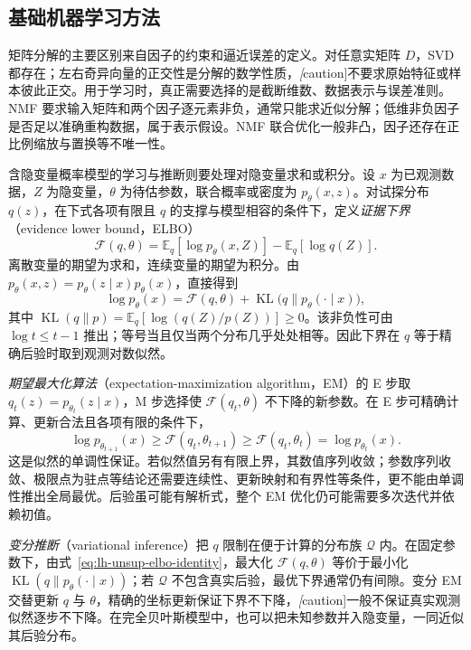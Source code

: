 \subsection{基础机器学习方法}
\label{subsec:lh-unsup-basic-methods}

矩阵分解的主要区别来自因子的约束和逼近误差的定义。对任意实矩阵 $D$，SVD 都存在；左右奇异向量的正交性是分解的数学性质，\emph[caution]{不要求原始特征或样本彼此正交}。用于学习时，真正需要选择的是截断维数、数据表示与误差准则。NMF 要求输入矩阵和两个因子逐元素非负，通常只能求近似分解；低维非负因子是否足以准确重构数据，属于表示假设。NMF 联合优化一般非凸，因子还存在正比例缩放与置换等不唯一性。

含隐变量概率模型的学习与推断则要处理对隐变量求和或积分。设 $x$ 为已观测数据，$Z$ 为隐变量，$\theta$ 为待估参数，联合概率或密度为 $p_\theta(x,z)$。对试探分布 $q(z)$，在下式各项有限且 $q$ 的支撑与模型相容的条件下，定义\emph{证据下界}（evidence lower bound，ELBO）
\begin{equation}
\label{eq:lh-unsup-elbo}
    \mathcal F(q,\theta)
    =\mathbb E_q[\log p_\theta(x,Z)]-\mathbb E_q[\log q(Z)].
\end{equation}
离散变量的期望为求和，连续变量的期望为积分。由 $p_\theta(x,z)=p_\theta(z\mid x)p_\theta(x)$，直接得到
\begin{equation}
\label{eq:lh-unsup-elbo-identity}
    \log p_\theta(x)=\mathcal F(q,\theta)
    +\operatorname{KL}\bigl(q\|p_\theta(\cdot\mid x)\bigr),
\end{equation}
其中 $\operatorname{KL}(q\|p)=\mathbb E_q[\log(q(Z)/p(Z))]\geq0$。该非负性可由 $\log t\leq t-1$ 推出；等号当且仅当两个分布几乎处处相等。因此下界在 $q$ 等于精确后验时取到观测对数似然。

\emph{期望最大化算法}（expectation-maximization algorithm，EM）的 E 步取 $q_t(z)=p_{\theta_t}(z\mid x)$，M 步选择使 $\mathcal F(q_t,\theta)$ 不下降的新参数。在 E 步可精确计算、更新合法且各项有限的条件下，
\[
    \log p_{\theta_{t+1}}(x)
    \geq\mathcal F(q_t,\theta_{t+1})
    \geq\mathcal F(q_t,\theta_t)
    =\log p_{\theta_t}(x).
\]
这是似然的单调性保证。若似然值另有有限上界，其数值序列收敛；参数序列收敛、极限点为驻点等结论还需要连续性、更新映射和有界性等条件，更不能由单调性推出全局最优。后验虽可能有解析式，整个 EM 优化仍可能需要多次迭代并依赖初值。

\emph{变分推断}（variational inference）把 $q$ 限制在便于计算的分布族 $\mathcal Q$ 内。在固定参数下，由式~\eqref{eq:lh-unsup-elbo-identity}，最大化 $\mathcal F(q,\theta)$ 等价于最小化 $\operatorname{KL}(q\|p_\theta(\cdot\mid x))$；若 $\mathcal Q$ 不包含真实后验，最优下界通常仍有间隙。变分 EM 交替更新 $q$ 与 $\theta$，精确的坐标更新保证下界不下降，\emph[caution]{一般不保证真实观测似然逐步不下降}。在完全贝叶斯模型中，也可以把未知参数并入隐变量，一同近似其后验分布。

